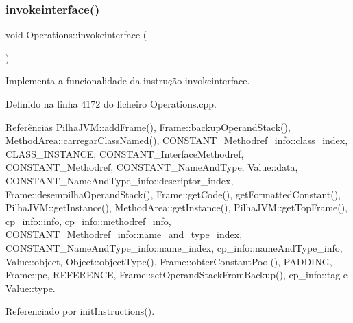 \subsubsection{\texorpdfstring{invokeinterface()}{invokeinterface()}}
{\footnotesize\ttfamily void Operations\+::invokeinterface (\begin{DoxyParamCaption}{ }\end{DoxyParamCaption})\hspace{0.3cm}{\ttfamily [private]}}



Implementa a funcionalidade da instrução invokeinterface. 



Definido na linha 4172 do ficheiro Operations.\+cpp.



Referências Pilha\+J\+V\+M\+::add\+Frame(), Frame\+::backup\+Operand\+Stack(), Method\+Area\+::carregar\+Class\+Named(), C\+O\+N\+S\+T\+A\+N\+T\+\_\+\+Methodref\+\_\+info\+::class\+\_\+index, C\+L\+A\+S\+S\+\_\+\+I\+N\+S\+T\+A\+N\+CE, C\+O\+N\+S\+T\+A\+N\+T\+\_\+\+Interface\+Methodref, C\+O\+N\+S\+T\+A\+N\+T\+\_\+\+Methodref, C\+O\+N\+S\+T\+A\+N\+T\+\_\+\+Name\+And\+Type, Value\+::data, C\+O\+N\+S\+T\+A\+N\+T\+\_\+\+Name\+And\+Type\+\_\+info\+::descriptor\+\_\+index, Frame\+::desempilha\+Operand\+Stack(), Frame\+::get\+Code(), get\+Formatted\+Constant(), Pilha\+J\+V\+M\+::get\+Instance(), Method\+Area\+::get\+Instance(), Pilha\+J\+V\+M\+::get\+Top\+Frame(), cp\+\_\+info\+::info, cp\+\_\+info\+::methodref\+\_\+info, C\+O\+N\+S\+T\+A\+N\+T\+\_\+\+Methodref\+\_\+info\+::name\+\_\+and\+\_\+type\+\_\+index, C\+O\+N\+S\+T\+A\+N\+T\+\_\+\+Name\+And\+Type\+\_\+info\+::name\+\_\+index, cp\+\_\+info\+::name\+And\+Type\+\_\+info, Value\+::object, Object\+::object\+Type(), Frame\+::obter\+Constant\+Pool(), P\+A\+D\+D\+I\+NG, Frame\+::pc, R\+E\+F\+E\+R\+E\+N\+CE, Frame\+::set\+Operand\+Stack\+From\+Backup(), cp\+\_\+info\+::tag e Value\+::type.



Referenciado por init\+Instructions().


